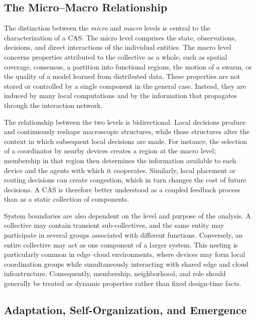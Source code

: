 \subsection{The Micro--Macro Relationship}
\label{subsec:cas-micro-macro}

The distinction between the \emph{micro} and \emph{macro} levels 
 is central to the characterization of a CAS. 
% 
The micro level comprises the state, observations, decisions, 
 and direct interactions of the individual entities.
%
The macro level concerns properties attributed to the collective as a whole,
 such as spatial coverage, consensus, a partition into functional regions, 
 the motion of a swarm, or the quality of a model learned from distributed data.
%
These properties are not stored or controlled by a single component in the general case. 
%
Instead, 
 they are induced by many local computations 
 and by the information that propagates through the interaction network.

The relationship between the two levels is bidirectional. 
%
Local decisions produce and continuously reshape macroscopic structures, 
 while those structures alter the context in which subsequent local decisions are made.
%
For instance,
 the selection of a coordinator by nearby devices creates a region at the macro level; 
 membership in that region then determines the information available to each device 
 and the agents with which it cooperates. 
% 
Similarly, 
 local placement or routing decisions can create congestion, 
 which in turn changes the cost of future decisions. 
% 
A \gls{CAS} is therefore better understood as a coupled feedback process 
 than as a static collection of components.

System boundaries are also dependent on the level 
 and purpose of the analysis.
%
A collective may contain transient sub-collectives, 
 and the same entity may participate in several groups associated with different functions. 
% 
Conversely,
 an entire collective may act as one component of a larger system. 
% 
This nesting is particularly common in edge--cloud environments, 
 where devices may form local coordination groups while simultaneously interacting with shared edge 
 and cloud infrastructure. 
% 
Consequently, membership, neighborhood, and role should generally be treated 
 as dynamic properties rather than fixed design-time facts.

\subsection{Adaptation, Self-Organization, and Emergence}
\label{subsec:cas-adaptation}

